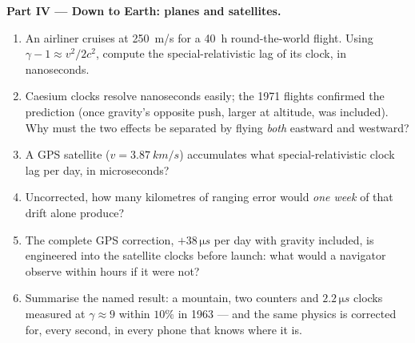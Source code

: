 \begin{problem}
\medskip\noindent\textbf{Part IV --- Down to Earth: planes and
satellites.}
\begin{enumerate}[resume]
  \item An airliner cruises at \qty{250}{m/s} for a \qty{40}{h}
        round-the-world flight. Using $\gamma - 1 \approx v^2/2c^2$,
        compute the special-relativistic lag of its clock, in
        nanoseconds.
  \item Caesium clocks resolve nanoseconds easily; the 1971 flights
        confirmed the prediction (once gravity's opposite push,
        larger at altitude, was included). Why must the two effects
        be separated by flying \emph{both} eastward and westward?
  \item A GPS satellite ($v = \qty{3.87}{km/s}$) accumulates what
        special-relativistic clock lag per day, in microseconds?
  \item Uncorrected, how many kilometres of ranging error would
        \emph{one week} of that drift alone produce?
  \item The complete GPS correction, $+38\,\unit{\micro s}$ per day
        with gravity included, is engineered into the satellite
        clocks before launch: what would a navigator observe within
        hours if it were not?
  \item Summarise the named result: a mountain, two counters and
        $2.2\,\unit{\micro s}$ clocks measured  at
        $\gamma \approx 9$ within $10\%$ in 1963 --- and the same
        physics is corrected for, every second, in every phone that
        knows where it is.
\end{enumerate}
\end{problem}
